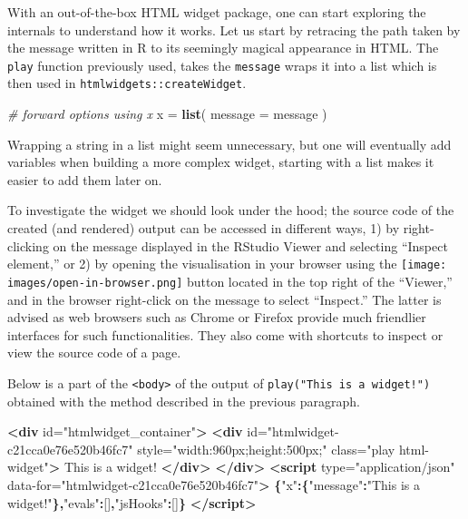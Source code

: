 \documentclass[
  10pt,
]{krantz}
\makeatletter
\newenvironment{Shaded}{\begin{snugshade}}{\end{snugshade}}
\newcommand{\CommentTok}[1]{\textcolor[rgb]{0.37,0.37,0.37}{\textit{#1}}}
\newcommand{\DataTypeTok}[1]{\textcolor[rgb]{0.27,0.27,0.27}{#1}}
\newcommand{\KeywordTok}[1]{\textcolor[rgb]{0.27,0.27,0.27}{\textbf{#1}}}
\newcommand{\NormalTok}[1]{#1}
\newcommand{\OperatorTok}[1]{\textcolor[rgb]{0.43,0.43,0.43}{\textbf{#1}}}
\newcommand{\OtherTok}[1]{\textcolor[rgb]{0.37,0.37,0.37}{#1}}
\newcommand{\StringTok}[1]{\textcolor[rgb]{0.5,0.5,0.5}{#1}}
\newenvironment{kframe}{%
\medskip{}
\setlength{\fboxsep}{.8em}
 \def\at@end@of@kframe{}%
 \ifinner\ifhmode%
  \def\at@end@of@kframe{\end{minipage}}%
  \begin{minipage}{\columnwidth}%
 \fi\fi%
 \def\FrameCommand##1{\hskip\@totalleftmargin \hskip-\fboxsep
 \colorbox{shadecolor}{##1}\hskip-\fboxsep
     \hskip-\linewidth \hskip-\@totalleftmargin \hskip\columnwidth}%
 \MakeFramed {\advance\hsize-\width
   \@totalleftmargin\z@ \linewidth\hsize
   \@setminipage}}%
 {\par\unskip\endMakeFramed%
 \at@end@of@kframe}
\renewenvironment{Shaded}{\begin{kframe}}{\end{kframe}}
\makeatother
\begin{document}
With an out-of-the-box HTML widget package, one can start exploring the internals to understand how it works. Let us start by retracing the path taken by the message written in R to its seemingly magical appearance in HTML. The \texttt{play} function previously used, takes the \texttt{message} wraps it into a list which is then used in \texttt{htmlwidgets::createWidget}.

\begin{Shaded}
\begin{Highlighting}[]
\CommentTok{\# forward options using x}
\NormalTok{x =}\StringTok{ }\KeywordTok{list}\NormalTok{(}
  \DataTypeTok{message =}\NormalTok{ message}
\NormalTok{)}
\end{Highlighting}
\end{Shaded}

Wrapping a string in a list might seem unnecessary, but one will eventually add variables when building a more complex widget, starting with a list makes it easier to add them later on.

To investigate the widget we should look under the hood; the source code of the created (and rendered) output can be accessed in different ways, 1) by right-clicking on the message displayed in the RStudio Viewer and selecting ``Inspect element,'' or 2) by opening the visualisation in your browser using the \texttt{[image: images/open-in-browser.png]} button located in the top right of the ``Viewer,'' and in the browser right-click on the message to select ``Inspect.'' The latter is advised as web browsers such as Chrome or Firefox provide much friendlier interfaces for such functionalities. They also come with shortcuts to inspect or view the source code of a page.

Below is a part of the \texttt{\textless{}body\textgreater{}} of the output of \texttt{play("This\ is\ a\ widget!")} obtained with the method described in the previous paragraph.

\begin{Shaded}
\begin{Highlighting}[]
\KeywordTok{<div}\OtherTok{ id=}\StringTok{"htmlwidget\_container"}\KeywordTok{>}
  \KeywordTok{<div} 
\OtherTok{    id=}\StringTok{"htmlwidget{-}c21cca0e76e520b46fc7"} 
\OtherTok{    style=}\StringTok{"width:960px;height:500px;"} 
\OtherTok{    class=}\StringTok{"play html{-}widget"}\KeywordTok{>}
\NormalTok{    This is a widget!}
  \KeywordTok{</div>}
\KeywordTok{</div>}
\KeywordTok{<script} 
\OtherTok{  type=}\StringTok{"application/json"} 
\OtherTok{  data{-}for=}\StringTok{"htmlwidget{-}c21cca0e76e520b46fc7"}\KeywordTok{>}
  \OperatorTok{\{}\StringTok{"x"}\OperatorTok{:\{}\StringTok{"message"}\OperatorTok{:}\StringTok{"This is a widget!"}\OperatorTok{\},}\StringTok{"evals"}\OperatorTok{:}\NormalTok{[]}\OperatorTok{,}\StringTok{"jsHooks"}\OperatorTok{:}\NormalTok{[]}\OperatorTok{\}}
\KeywordTok{</script>}
\end{Highlighting}
\end{Shaded}
\end{document}
